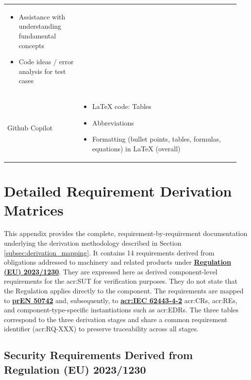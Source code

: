 \begin{table}[hbt]
\begin{tabular}{>{\raggedright\arraybackslash}p{0.3\linewidth} >{\raggedright\arraybackslash}p{0.65\linewidth}}
\begin{itemize}[noitemsep,topsep=0pt,partopsep=0pt,parsep=0pt]
			\item Assistance with understanding fundamental concepts
			\item Code ideas / error analysis for test cases
		\end{itemize} \\ 
		Github Copilot	&	\vspace{-\topsep}
		\begin{itemize}[noitemsep,topsep=0pt,partopsep=0pt,parsep=0pt] 
			\item LaTeX code: Tables
			\item Abbreviations
			\item Formatting (bullet points, tables, formulas, equations) in LaTeX (overall)
		\end{itemize} \\ 
		\hline 
	\end{tabular} 
\end{table}

\clearpage



\chapter{Detailed Requirement Derivation Matrices}
\label{app:requirement_derivation}


This appendix provides the complete, requirement-by-requirement documentation underlying the derivation methodology described in Section \ref{subsec:derivation_mapping}. It contains 14 requirements derived from obligations addressed to machinery and related products under \hyperref[subsec:eu_machinery_regulation]{\textbf{Regulation (EU) 2023/1230}}. They are expressed here as derived component-level requirements for the \gls{acr:SUT} for verification purposes. They do not state that the Regulation applies directly to the component. The requirements are mapped to \hyperref[subsec:pren_50742]{\textbf{prEN 50742}} and, subsequently, to \hyperref[subsec:iec_62443]{\textbf{\gls{acr:IEC} 62443-4-2}} \glspl{acr:CR}, \glspl{acr:RE}, and component-type-specific instantiations such as \glspl{acr:EDR}. The three tables correspond to the three derivation stages and share a common requirement identifier (\gls{acr:RQ}-XXX) to preserve traceability across all stages.

\section{Security Requirements Derived from Regulation (EU) 2023/1230}
\label{app:sec:mvo_requirements}

